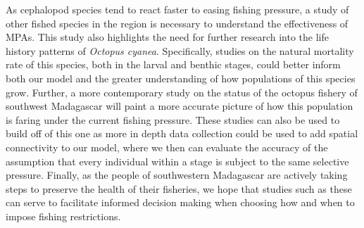 \documentclass[
]{article}
\begin{document}
As cephalopod species tend to react faster to easing fishing pressure, a study of other fished species in the region is necessary to understand the effectiveness of MPAs. This study also highlights the need for further research into the life history patterns of \emph{Octopus cyanea}. Specifically, studies on the natural mortality rate of this species, both in the larval and benthic stages, could better inform both our model and the greater understanding of how populations of this species grow. Further, a more contemporary study on the status of the octopus fishery of southwest Madagascar will paint a more accurate picture of how this population is faring under the current fishing pressure. These studies can also be used to build off of this one as more in depth data collection could be used to add spatial connectivity to our model, where we then can evaluate the accuracy of the assumption that every individual within a stage is subject to the same selective pressure. Finally, as the people of southwestern Madagascar are actively taking steps to preserve the health of their fisheries, we hope that studies such as these can serve to facilitate informed decision making when choosing how and when to impose fishing restrictions.
\end{document}
